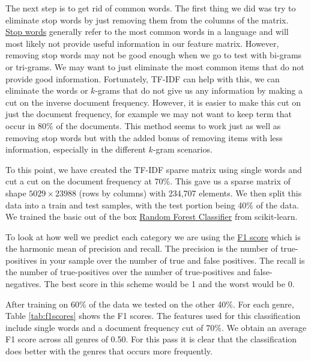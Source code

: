 \documentclass[11pt]{article}
\begin{document}
The next step is to get rid of common words. The first thing we did was try to eliminate stop words by just removing them from the columns of the matrix. \href{https://en.wikipedia.org/wiki/Stop_words}{Stop words} generally refer to the most common words in a language and will most likely not provide useful information in our feature matrix. However, removing stop words may not be good enough when we go to test with bi-grams or tri-grams. We may want to just eliminate the most common items that do not provide good information. Fortunately, TF-IDF can help with this, we can eliminate the words or $k$-grams that do not give us any information by making a cut on the inverse document frequency. However, it is easier to make this cut on just the document frequency, for example we may not want to keep term that occur in 80\% of the documents. This method seems to work just as well as removing stop words but with the added bonus of removing items with less information, especially in the different $k$-gram scenarios.

To this point, we have created the TF-IDF sparse matrix using single words and cut a cut on the document frequency at 70\%. This gave us a sparse matrix of shape $5029 \times 23988$ (rows by columns) with 234,707 elements. We then split this data into a train and test samples, with the test portion being 40\% of the data. We trained the basic out of the box \href{http://scikit-learn.org/stable/modules/generated/sklearn.ensemble.RandomForestClassifier.html}{Random Forest Classifier} from scikit-learn. 

To look at how well we predict each category we are using the \href{https://en.wikipedia.org/wiki/F1_score}{F1 score} which is the harmonic mean of precision and recall. The precision is the number of true-positives in your sample over the number of true and false positives. The recall is the number of true-positives over the number of true-positives and false-negatives. The best score in this scheme would be 1 and the worst would be 0.

After training on 60\% of the data we tested on the other 40\%. For each genre, Table \ref{tab:f1scores} shows the F1 scores. The features used for this classification include single words and a document frequency cut of 70\%. We obtain an average F1 score across all genres of 0.50. For this pass it is clear that the classification does better with the genres that occurs more frequently.
\end{document}
